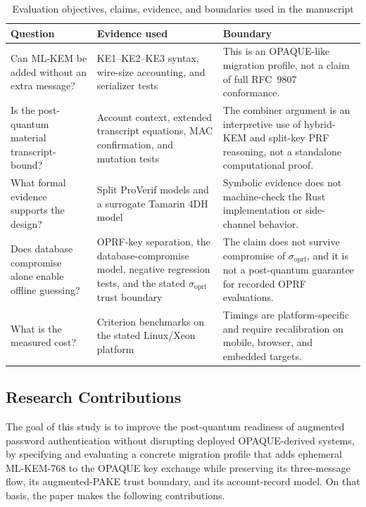\documentclass[preprint,12pt]{elsarticle}
\newcommand{\sigoprf}{\sigma_{\mathrm{oprf}}}
\theoremstyle{remark}
\begin{document}
\begin{table}[htbp]
\caption{Evaluation objectives, claims, evidence, and boundaries used in the manuscript}
\label{tab:objective-evidence}
\centering\scriptsize
\begin{tabularx}{\textwidth}{@{}L{3.2cm}L{5.2cm}X@{}}
\toprule
Question & Evidence used & Boundary \\
\midrule
Can ML-KEM be added without an extra message? & KE1--KE2--KE3 syntax,
wire-size accounting, and serializer tests & This is an OPAQUE-like
migration profile, not a claim of full RFC~9807 conformance. \\
Is the post-quantum material transcript-bound? & Account context,
extended transcript equations, MAC confirmation, and mutation tests &
The combiner argument is an interpretive use of hybrid-KEM and split-key PRF
reasoning, not a standalone computational proof. \\
What formal evidence supports the design? & Split ProVerif models and a
surrogate Tamarin 4DH model & Symbolic evidence does not machine-check the
Rust implementation or side-channel behavior. \\
Does database compromise alone enable offline guessing? & OPRF-key separation,
the database-compromise model, negative regression tests, and the stated
$\sigoprf$ trust boundary & The claim does not survive compromise of
$\sigoprf$, and it is not a post-quantum guarantee for recorded OPRF
evaluations. \\
What is the measured cost? & Criterion benchmarks on the stated Linux/Xeon
platform & Timings are platform-specific and require recalibration on mobile,
browser, and embedded targets. \\
\bottomrule
\end{tabularx}
\end{table}

\subsection{Research Contributions}

The goal of this study is to improve the post-quantum readiness of augmented
password authentication without disrupting deployed OPAQUE-derived systems, by
specifying and evaluating a concrete migration profile that adds ephemeral
ML-KEM-768 to the OPAQUE key exchange while preserving its three-message flow,
its augmented-PAKE trust boundary, and its account-record model. On that basis,
the paper makes the following contributions.
\end{document}
